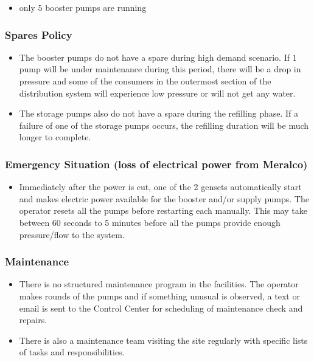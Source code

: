 \begin{itemize}
	\item only 5 booster pumps are running
\end{itemize}

\subsubsection{Spares Policy}

\begin{itemize}
	\item The booster pumps do not have a spare during high demand scenario. If 1 pump will be under maintenance during this period, there will be a drop in pressure and some of the consumers in the outermost section of the distribution system will experience low pressure or will not get any water. 
	\item The storage pumps also do not have a spare during the refilling phase. If a failure of one of the storage pumps occurs, the refilling duration will be much longer to complete.
\end{itemize}

\subsubsection{Emergency Situation (loss of electrical power from Meralco)}
\begin{itemize}
	\item Immediately after the power is cut, one of the 2 gensets automatically start and makes electric power available for the booster and/or supply pumps. The operator resets all the pumps before restarting each manually. This may take between 60 seconds to 5 minutes before all the pumps provide enough pressure/flow to the system.
\end{itemize}

\subsubsection{Maintenance}
\begin{itemize}
	\item There is no structured maintenance program in the facilities. The operator makes rounds of the pumps and if something unusual is observed, a text or email is sent to the Control Center for scheduling of maintenance check and repairs.
	\item There is also a maintenance team visiting the site regularly with specific lists of tasks and responsibilities.
\end{itemize}

